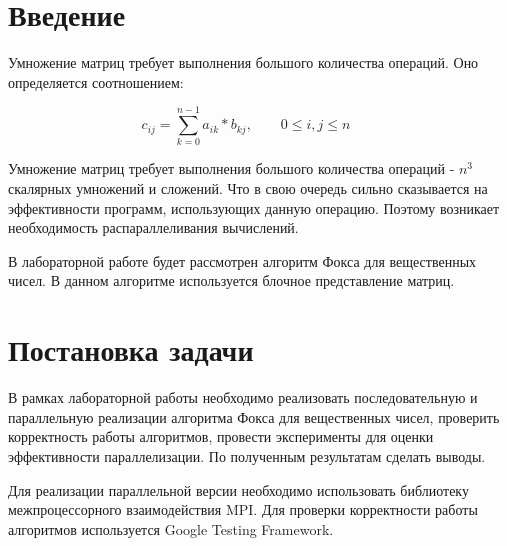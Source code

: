 \documentclass{report}
\begin{document}
\setcounter{page}{2}

\tableofcontents
\newpage

\section*{Введение}
Умножение матриц требует выполнения большого количества операций.  Оно определяется соотношением:
\par$$
    c_{ij} = \sum_{k=0}^{n-1} a_{ik} * b_{kj},\qquad 0 \le i,j \le n \qquad
    $$

Умножение матриц требует выполнения большого количества операций - $n^3$ скалярных умножений и сложений. Что в свою очередь сильно сказывается на эффективности программ, использующих данную операцию. Поэтому возникает необходимость распараллеливания вычислений.
\par В лабораторной работе будет рассмотрен алгоритм Фокса для вещественных чисел. В данном алгоритме используется блочное представление матриц.

\newpage

\section*{Постановка задачи}
В рамках лабораторной работы необходимо реализовать последовательную и параллельную реализации алгоритма Фокса для вещественных чисел, проверить корректность работы алгоритмов, провести эксперименты для оценки эффективности параллелизации. По полученным результатам сделать выводы.
\par Для реализации параллельной версии необходимо использовать библиотеку межпроцессорного взаимодействия MPI. Для проверки корректности работы алгоритмов используется Google Testing Framework.
\newpage

\end{document}
